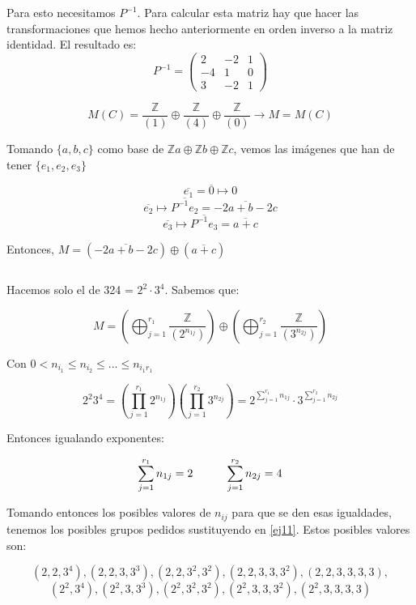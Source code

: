 \documentclass[openany]{book}
\begin{document}
\begin{exercise}
    Para esto necesitamos $ P ^{-1}$. Para calcular esta matriz hay que hacer las transformaciones que hemos hecho anteriormente en orden inverso a la matriz identidad. El resultado es:
    $$ P ^{-1} = \begin{pmatrix} 
    2 & -2 & 1\\ 
    -4 & 1 & 0\\ 
    3 & -2 & 1
    \end{pmatrix}  $$

    $$  M(C) = \dfrac{\mathbb{Z}}{(1)} \oplus \dfrac{\mathbb{Z}}{(4)} \oplus \dfrac{\mathbb{Z}}{(0)} \to M = M(C) $$

    Tomando $ \{a,b,c\}$ como base de $ \mathbb{Z}a \oplus \mathbb{Z}b \oplus \mathbb{Z}c$, vemos las imágenes que han de tener $ \{e_1,e_2,e_3\}$

    $$ \overline{e_1} = \overline{0} \mapsto 0 $$
    $$ \overline{e_2} \mapsto \overline{P ^{-1} e_2} = \overline{-2a+b-2c} $$
    $$ \overline{e_3} \mapsto \overline{P ^{-1} e_3} = \overline{a+c}$$

    Entonces, $ M = (\overline{-2a+b-2c}) \oplus (\overline{a+c})$

\end{exercise}

\begin{exercise}$ $

    Hacemos solo el de 324 = $ 2^2\cdot 3^{4}$. Sabemos que:

    \begin{equation}
        M = \left(  \bigoplus_{j=1}^{r_1} \dfrac{\mathbb{Z}}{(2^{n_{1j}})} \right)\oplus \left( \bigoplus_{j=1}^{r_2} \dfrac{\mathbb{Z}}{(3^{n_{2j}})} \right) 
        \label{ej11}
        \end{equation}

    Con $ 0 < n_{i_1} \leq  n_{i_2} \leq  ... \leq  n_{i_1r_1}$

    $$ 2^2 3 ^{4} = \left( \prod_{j=1}^{r_1} 2^{n_{1j}} \right) \left( \prod_{j=1}^{r_2} 3^{n_{2j}} \right) = 2^{\sum\limits_{j=1}^{r_1} n_{1j}} \cdot 3^{\sum\limits_{j=1}^{r_2}n_{2j}} $$

    Entonces igualando exponentes:

    $$ \sum\limits_{j=1}^{r_1} n_{1j} = 2 \hspace{10mm} \sum\limits_{j=1}^{r_2}n_{2j} = 4 $$

    Tomando entonces los posibles valores de $ n_{ij}$ para que se den esas igualdades, tenemos los posibles grupos pedidos sustituyendo en \eqref{ej11}. Estos posibles valores son:
    
    $$ (2,2,3^{4}),(2,2,3,3^3),(2,2,3^2,3^2),(2,2,3,3,3^2),(2,2,3,3,3,3),$$ 
    $$(2^2,3^{4}),(2^2,3,3^3),(2^2,3^2,3^2),(2^2,3,3,3^2),(2^2,3,3,3,3) $$


\end{exercise}
\end{document}
